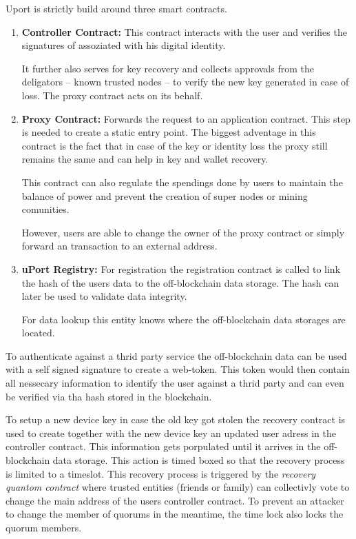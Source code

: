 Uport is strictly build around three smart contracts.
\begin{enumerate}
\item \textbf{Controller Contract:} This contract interacts with the user and verifies the signatures of assoziated with his digital identity.

It further also serves for key recovery and collects approvals from the deligators -- known trusted nodes -- to verify the new key generated in case of loss.
The proxy contract acts on its behalf. 

\item \textbf{Proxy Contract:}
Forwards the request to an application contract. This step is needed to create a static entry point.
The biggest adventage in this contract is the fact that in case of the key or identity loss the proxy still remains the same and can help in key and wallet recovery.

This contract can also regulate the spendings done by users to maintain the balance of power and prevent the creation of super nodes or mining comunities.

However, users are able to change the owner of the proxy contract or simply forward an transaction to an external address\cite[p. 6]{uPortWhitePaper}.

\item \textbf{uPort Registry:}
For registration the registration contract is called to link the hash of the users data to the off-blockchain data storage. The hash can later be used to validate data integrity. 

For data lookup this entity knows where the off-blockchain data storages are located.

\end{enumerate}

To authenticate against a thrid party service the off-blockchain data can be used with a self signed signature to create a web-token. This token would then contain all nessecary information to identify the user against a thrid party and can even be verified via tha hash stored in the blockchain.

To setup a new device key in case the old key got stolen the recovery contract is used to create together with the new device key an updated user adress in the controller contract. This information gets porpulated until it arrives in the off-blockchain data storage. This action is timed boxed so that the recovery process is limited to a timeslot. This recovery process is triggered by the \textit{recovery quantom contract} where trusted entities (friends or family) can collectivly vote to change the main address of the users controller contract. To prevent an attacker to change the member of quorums in the meantime, the time lock also locks the quorum members.

